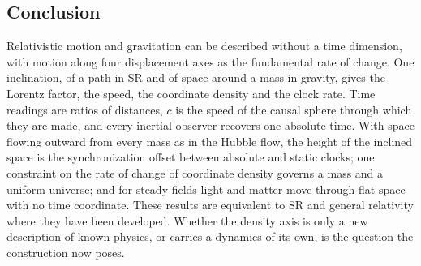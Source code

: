 \documentclass[anonymous]{iopjournal}
\begin{document}
\subsection{Conclusion}

Relativistic motion and gravitation can be described without a time dimension, with motion along four displacement axes as the fundamental rate of change. One inclination, of a path in SR and of space around a mass in gravity, gives the Lorentz factor, the speed, the coordinate density and the clock rate. Time readings are ratios of distances, $c$ is the speed of the causal sphere through which they are made, and every inertial observer recovers one absolute time. With space flowing outward from every mass as in the Hubble flow, the height of the inclined space is the synchronization offset between absolute and static clocks; one constraint on the rate of change of coordinate density governs a mass and a uniform universe; and for steady fields light and matter move through flat space with no time coordinate. These results are equivalent to SR and general relativity where they have been developed. Whether the density axis is only a new description of known physics, or carries a dynamics of its own, is the question the construction now poses.
\end{document}
